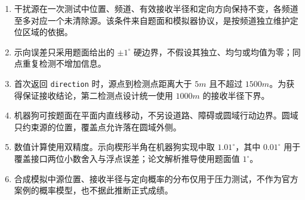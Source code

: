 \begin{enumerate}
  \item 干扰源在一次测试中位置、频道、有效接收半径和定向方向保持不变，各频道至多对应一个未清除源。该条件来自题面和模拟器协议，是按频道独立维护定位区域的依据。
  \item 示向误差只采用题面给出的 $\pm1^\circ$ 硬边界，不假设其独立、均匀或均值为零；同点重复检测不增加信息。
  \item 首次返回 \texttt{direction} 时，源点到检测点距离大于 $5\unit{m}$ 且不超过 $1500\unit{m}$。为获得保证接收结论，第二检测点设计统一使用 $1000\unit{m}$ 的接收半径下界。
  \item 机器狗可按题面在平面内直线移动，不另设道路、障碍或圆域行动边界。圆域只约束源的位置，覆盖点允许落在圆域外侧。
  \item 数值计算使用双精度。示向楔形半角在机器狗实现中取 $1.01^\circ$，其中 $0.01^\circ$ 用于覆盖接口两位小数舍入与浮点误差；论文解析推导使用题面值 $1^\circ$。
  \item 合成模拟中源位置、接收半径与定向概率的分布仅用于压力测试，不作为官方案例的概率模型，也不据此推断正式成绩。
\end{enumerate}
